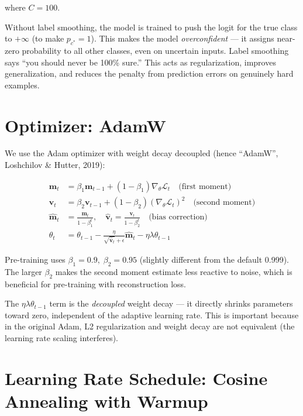 \documentclass[12pt, a4paper]{report}
\newcommand{\vect}[1]{\bm{#1}}
\begin{document}
where $C = 100$.

\begin{intuitionbox}
Without label smoothing, the model is trained to push the logit for the true class to $+\infty$ (to make $p_{c^*} = 1$). This makes the model \emph{overconfident} — it assigns near-zero probability to all other classes, even on uncertain inputs. Label smoothing says ``you should never be 100\% sure.'' This acts as regularization, improves generalization, and reduces the penalty from prediction errors on genuinely hard examples.
\end{intuitionbox}

\section{Optimizer: AdamW}

We use the Adam optimizer with weight decay decoupled (hence ``AdamW'', Loshchilov \& Hutter, 2019):

\begin{align}
\vect{m}_t &= \beta_1 \vect{m}_{t-1} + (1 - \beta_1) \nabla_\theta \mathcal{L}_t \quad \text{(first moment)} \\
\vect{v}_t &= \beta_2 \vect{v}_{t-1} + (1 - \beta_2) (\nabla_\theta \mathcal{L}_t)^2 \quad \text{(second moment)} \\
\hat{\vect{m}}_t &= \frac{\vect{m}_t}{1 - \beta_1^t}, \quad \hat{\vect{v}}_t = \frac{\vect{v}_t}{1 - \beta_2^t} \quad \text{(bias correction)} \\
\theta_t &= \theta_{t-1} - \frac{\eta}{\sqrt{\hat{\vect{v}}_t} + \epsilon} \hat{\vect{m}}_t - \eta \lambda \theta_{t-1}
\end{align}

Pre-training uses $\beta_1 = 0.9,\; \beta_2 = 0.95$ (slightly different from the default 0.999). The larger $\beta_2$ makes the second moment estimate less reactive to noise, which is beneficial for pre-training with reconstruction loss.

The $\eta \lambda \theta_{t-1}$ term is the \emph{decoupled} weight decay — it directly shrinks parameters toward zero, independent of the adaptive learning rate. This is important because in the original Adam, L2 regularization and weight decay are not equivalent (the learning rate scaling interferes).

\section{Learning Rate Schedule: Cosine Annealing with Warmup}
\end{document}
